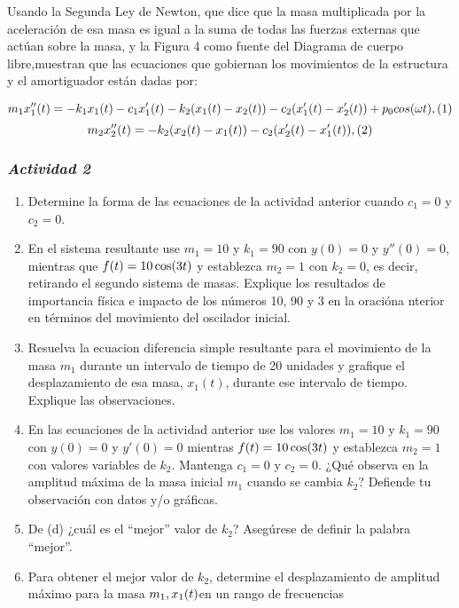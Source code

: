 \documentclass[
]{article}
\providecommand{\tightlist}{%
  \setlength{\itemsep}{0pt}\setlength{\parskip}{0pt}}
\begin{document}
Usando la Segunda Ley de Newton, que dice que la masa multiplicada por
la aceleración de esa masa es igual a la suma de todas las fuerzas
externas que actúan sobre la masa, y la Figura 4 como fuente del
Diagrama de cuerpo libre,muestran que las ecuaciones que gobiernan los
movimientos de la estructura y el amortiguador están dadas por:

\[ m_1 \space x''_1(t) = -k_1 x_1(t)- c_1x'_1(t)-k_2(x_1(t)-x_2(t))-c_2(x'_1(t)-x'_2(t))+p_0 \space cos(\omega t), \space\space\space\space (1)\]
\[ m_2 \space x''_2(t) = -k_2(x_2(t)-x_1(t))-c_2(x'_2(t)-x'_1(t)), \space\space\space\space (2) \]

\hypertarget{actividad-2}{%
\subsubsection{\texorpdfstring{\emph{Actividad
2}}{Actividad 2}}\label{actividad-2}}

\begin{enumerate}
\def\labelenumi{\alph{enumi})}
\tightlist
\item
  Determine la forma de las ecuaciones de la actividad anterior cuando
  \(c_1 = 0\) y \(c_2 = 0\).
\item
  En el sistema resultante use \(m_1 = 10\) y \(k_1 = 90\) con
  \(y(0) = 0\) y \(y''(0) = 0\), mientras que
  \(f(t) =10 \space\space \cos (3t)\) y establezca \(m_2 = 1\) con
  \(k_2 = 0\), es decir, retirando el segundo sistema de masas. Explique
  los resultados de importancia física e impacto de los números 10, 90 y
  3 en la oracióna nterior en términos del movimiento del oscilador
  inicial.
\item
  Resuelva la ecuacion diferencia simple resultante para el movimiento
  de la masa \(m_1\) durante un intervalo de tiempo de 20 unidades y
  grafique el desplazamiento de esa masa, \(x_1(t)\), durante ese
  intervalo de tiempo. Explique las observaciones.
\item
  En las ecuaciones de la actividad anterior use los valores \(m_1=10\)
  y \(k_1=90\) con \(y(0)=0\) y \(y'(0)=0\) mientras
  \(f(t)=10 \space\space \cos (3t)\) y establezca \(m_2=1\) con valores
  variables de \(k_2\). Mantenga \(c_1=0\) y \(c_2=0\). ¿Qué observa en
  la amplitud máxima de la masa inicial \(m_1\) cuando se cambia
  \(k_2\)? Defiende tu observación con datos y/o gráficas.
\item
  De (d) ¿cuál es el ``mejor'' valor de \(k_2\)? Asegúrese de definir la
  palabra ``mejor''.
\item
  Para obtener el mejor valor de \(k_2\), determine el desplazamiento de
  amplitud máximo para la masa \(m_1 ,\space\space x_1 (t)\)en un rango
  de frecuencias
\end{enumerate}
\end{document}
